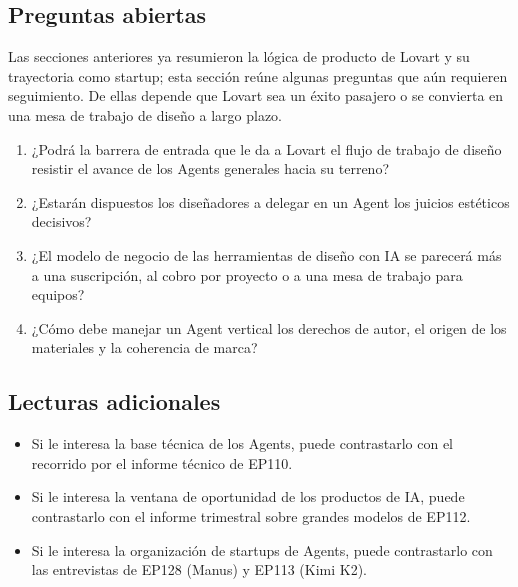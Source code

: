 \documentclass[a4paper]{article}
\begin{document}
\subsection{Preguntas abiertas}

Las secciones anteriores ya resumieron la lógica de producto de Lovart y su trayectoria como startup; esta sección reúne algunas preguntas que aún requieren seguimiento. De ellas depende que Lovart sea un éxito pasajero o se convierta en una mesa de trabajo de diseño a largo plazo.

\begin{enumerate}
\item ¿Podrá la barrera de entrada que le da a Lovart el flujo de trabajo de diseño resistir el avance de los Agents generales hacia su terreno?
\item ¿Estarán dispuestos los diseñadores a delegar en un Agent los juicios estéticos decisivos?
\item ¿El modelo de negocio de las herramientas de diseño con IA se parecerá más a una suscripción, al cobro por proyecto o a una mesa de trabajo para equipos?
\item ¿Cómo debe manejar un Agent vertical los derechos de autor, el origen de los materiales y la coherencia de marca?
\end{enumerate}

\subsection{Lecturas adicionales}

\begin{itemize}
\item Si le interesa la base técnica de los Agents, puede contrastarlo con el recorrido por el informe técnico de EP110.
\item Si le interesa la ventana de oportunidad de los productos de IA, puede contrastarlo con el informe trimestral sobre grandes modelos de EP112.
\item Si le interesa la organización de startups de Agents, puede contrastarlo con las entrevistas de EP128 (Manus) y EP113 (Kimi K2).
\end{itemize}
\end{document}
